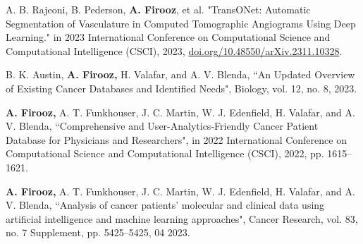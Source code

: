 
\def\spaceBetween{-1cm}
\def\spaceAfter{0.1cm}


\begin{cvpublication}
\vspace{-2mm}
    \cvpub
        {\begin{cvitems}
            \item {A. B. Rajeoni, B. Pederson, \textbf{A. Firooz}, et al. "TransONet: Automatic Segmentation of Vasculature in Computed Tomographic Angiograms Using Deep Learning." in 2023 International Conference on Computational Science and Computational Intelligence (CSCI), 2023, \href{https://doi.org/10.48550/arXiv.2311.10328}{doi.org/10.48550/arXiv.2311.10328}.}
        \end{cvitems}}
    {}
    \cvpub
        {\begin{cvitems}
            \item {B. K. Austin, \textbf{A. Firooz,} H. Valafar, and A. V. Blenda, “An Updated Overview of Existing Cancer Databases and Identified Needs", Biology, vol. 12, no. 8, 2023.}
        \end{cvitems}}
        {}
    \cvpub
        {\begin{cvitems}
            \item {\textbf{A. Firooz,} A. T. Funkhouser, J. C. Martin, W. J. Edenfield, H. Valafar, and A. V. Blenda, “Comprehensive and User-Analytics-Friendly Cancer Patient Database for Physicians and Researchers", in 2022 International Conference on Computational Science and Computational Intelligence (CSCI), 2022, pp. 1615–1621.}
        \end{cvitems}}
        {}
    \cvpub
        {\begin{cvitems}
            \item {\textbf{A. Firooz,} A. T. Funkhouser, J. C. Martin, W. J. Edenfield, H. Valafar, and A. V. Blenda, “Analysis of cancer patients’ molecular and clinical data using artificial intelligence and machine learning approaches", Cancer Research, vol. 83, no. 7 Supplement, pp. 5425–5425, 04 2023.}

\end{cvitems}}
\end{cvpublication}
